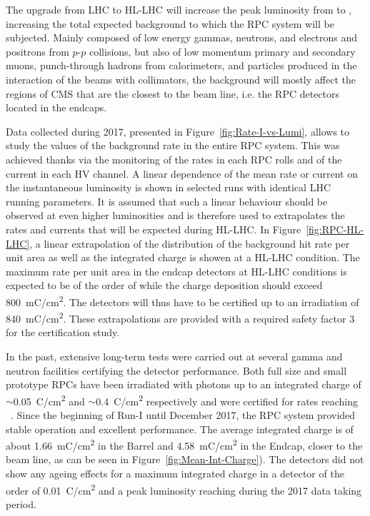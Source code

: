 	The upgrade from LHC to HL-LHC will increase the peak luminosity from  \siflux to  \siflux, increasing the total expected background to which the RPC system will be subjected. Mainly composed of low energy gammas, neutrons, and electrons and positrons from $p$-$p$ collisions, but also of low momentum primary and secondary muons, punch-through hadrons from calorimeters, and particles produced in the interaction of the beams with collimators, the background will mostly affect the regions of CMS that are the closest to the beam line, i.e. the RPC detectors located in the endcaps.

	Data collected during 2017, presented in Figure~\ref{fig:Rate-I-vs-Lumi}, allows to study the values of the background rate in the entire RPC system. This was achieved thanks via the monitoring of the rates in each RPC rolls and of the current in each HV channel. A linear dependence of the mean rate or current on the instantaneous luminosity is shown in selected runs with identical LHC running parameters. It is assumed that such a linear behaviour should be observed at even higher luminosities and is therefore used to extrapolates the rates and currents that will be expected during HL-LHC. In Figure~\ref{fig:RPC-HL-LHC}, a linear extrapolation of the distribution of the background hit rate per unit area as well as the integrated charge is showen at a HL-LHC condition. The maximum rate per unit area in the endcap detectors at HL-LHC conditions is expected to be of the order of  while the charge deposition should exceed \SI{800}{mC/cm^2}. The detectors will thus have to be certified up to an irradiation of \SI{840}{mC/cm^2}. These extrapolations are provided with a required safety factor 3 for the certification study.

	In the past, extensive long-term tests were carried out at several gamma and neutron facilities certifying the detector performance. Both full size and small prototype RPCs have been irradiated with photons up to an integrated charge of $\sim$\SI{0.05}{C/cm^2} and $\sim$\SI{0.4}{C/cm^2} respectively and were certified for rates reaching ~\cite{GIF2004,AGING2009}. Since the beginning of Run-I until December 2017, the RPC system provided stable operation and excellent performance. The average integrated charge is of about \SI{1.66}{mC/cm^2} in the Barrel and \SI{4.58}{mC/cm^2} in the Endcap, closer to the beam line, as can be seen in Figure~\ref{fig:Mean-Int-Charge}). The detectors did not show any ageing effects for a maximum integrated charge in a detector of the order of \SI{0.01}{C/cm^2} and a peak luminosity reaching  \siflux during the 2017 data taking period.

